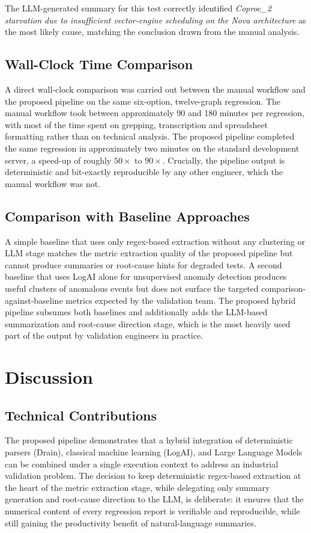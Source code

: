 \documentclass[conference]{IEEEtran}
\begin{document}
The LLM-generated summary for this test correctly identified \textit{Coproc\_2 starvation due to insufficient vector-engine scheduling on the Nova architecture} as the most likely cause, matching the conclusion drawn from the manual analysis.

\subsection{Wall-Clock Time Comparison}
A direct wall-clock comparison was carried out between the manual workflow and the proposed pipeline on the same six-option, twelve-graph regression. The manual workflow took between approximately 90 and 180 minutes per regression, with most of the time spent on grepping, transcription and spreadsheet formatting rather than on technical analysis. The proposed pipeline completed the same regression in approximately two minutes on the standard development server, a speed-up of roughly $50\times$ to $90\times$. Crucially, the pipeline output is deterministic and bit-exactly reproducible by any other engineer, which the manual workflow was not.

\subsection{Comparison with Baseline Approaches}
A simple baseline that uses only regex-based extraction without any clustering or LLM stage matches the metric extraction quality of the proposed pipeline but cannot produce summaries or root-cause hints for degraded tests. A second baseline that uses LogAI alone for unsupervised anomaly detection produces useful clusters of anomalous events but does not surface the targeted comparison-against-baseline metrics expected by the validation team. The proposed hybrid pipeline subsumes both baselines and additionally adds the LLM-based summarization and root-cause direction stage, which is the most heavily used part of the output by validation engineers in practice.

\section{Discussion}

\subsection{Technical Contributions}
The proposed pipeline demonstrates that a hybrid integration of deterministic parsers (Drain), classical machine learning (LogAI), and Large Language Models can be combined under a single execution context to address an industrial validation problem. The decision to keep deterministic regex-based extraction at the heart of the metric extraction stage, while delegating only summary generation and root-cause direction to the LLM, is deliberate: it ensures that the numerical content of every regression report is verifiable and reproducible, while still gaining the productivity benefit of natural-language summaries.
\end{document}
